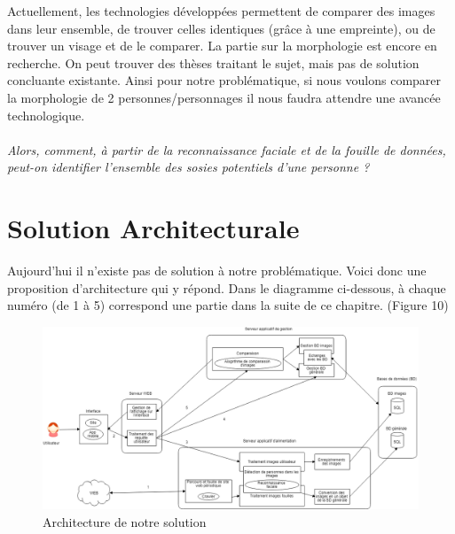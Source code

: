\documentclass[a4paper,12pt]{article}
\begin{document}
Actuellement, les technologies développées permettent de comparer des images dans leur ensemble, de trouver celles identiques (grâce à une empreinte), ou de trouver un visage et de le comparer. La partie sur la morphologie est encore en recherche. On peut trouver des thèses traitant le sujet, mais pas de solution concluante existante. Ainsi pour notre problématique, si nous voulons comparer la morphologie de 2 personnes/personnages il nous faudra attendre une avancée technologique. 
\\\\
\textit{Alors, comment, à partir de la reconnaissance faciale et de la fouille de données, peut-on identifier l’ensemble des sosies potentiels d’une personne ?}

\section{Solution Architecturale}
Aujourd'hui il n'existe pas de solution à notre problématique. Voici donc une proposition d'architecture qui y répond. Dans le diagramme ci-dessous, à chaque numéro (de 1 à 5) correspond une partie dans la suite de ce chapitre. (Figure 10)

\begin{figure}[!ht]
    \centering
        \includegraphics[scale=0.4, angle=-90]{images/SchemaArchitecture.png}
        \caption{Architecture de notre solution}
    \end{figure}
    
\end{document}
